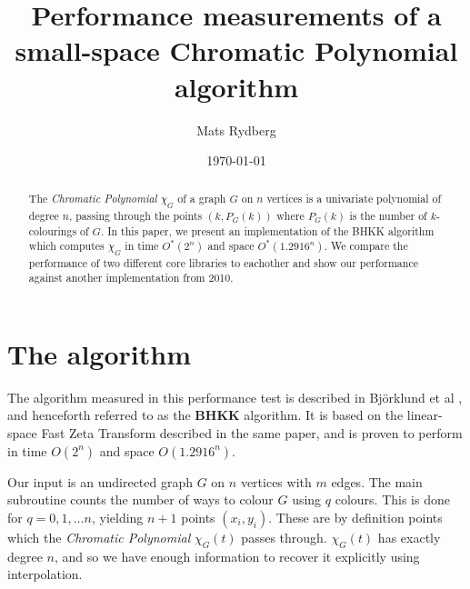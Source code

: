 \documentclass[a4paper]{article}
\title{\huge{Performance measurements of a small-space Chromatic Polynomial algorithm}}
\author{Mats Rydberg}
\date{\today}
\begin{document}
\maketitle

\begin{abstract}
 The \emph{Chromatic Polynomial} $\chi_G$ of a graph $G$ on $n$ vertices is a univariate polynomial of degree $n$, passing through the points $(k, P_G(k))$ where $P_G(k)$ is the number of $k$-colourings of $G$. In this paper, we present an implementation of the BHKK algorithm which computes $\chi_G$ in time $O^*(2^n)$ and space $O^*(1.2916^n)$. We compare the performance of two different core libraries to eachother and show our performance against another implementation from 2010.
\end{abstract}

\newpage


\section{The algorithm}
The algorithm measured in this performance test is described in Björklund et al \cite{cov_pack}, and henceforth referred to as the \textbf{BHKK} algorithm. It is based on the linear-space Fast Zeta Transform described in the same paper, and is proven to perform in time $O(2^n)$ and space $O(1.2916^n)$. 


Our input is an undirected graph $G$ on $n$ vertices with $m$ edges\footnotemark. The main subroutine counts the number of ways to colour $G$ using $q$ colours. This is done for $q = 0, 1, \ldots n$, yielding $n + 1$ points $(x_i, y_i)$. These are by definition points which the \emph{Chromatic Polynomial} $\chi_G(t)$ passes through. $\chi_G(t)$ has exactly degree $n$, and so we have enough information to recover it explicitly using interpolation.
\end{document}
